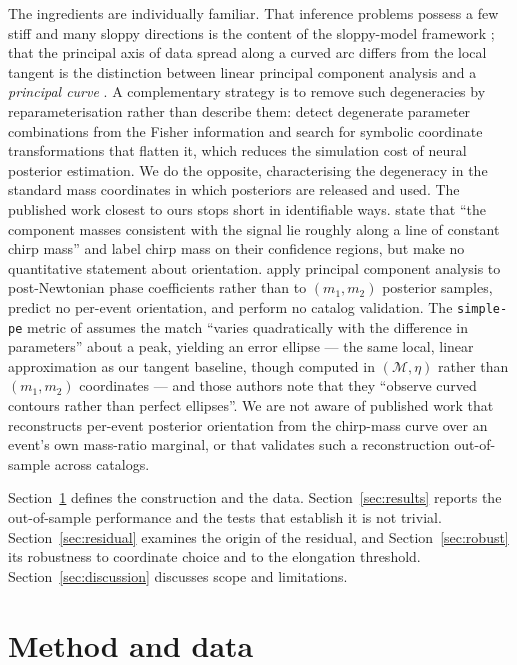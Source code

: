 \documentclass[aps,prd,twocolumn,amsmath,amssymb,nofootinbib,superscriptaddress]{revtex4-2}
\begin{document}
The ingredients are individually familiar. That inference problems possess a few stiff and many sloppy
directions is the content of the sloppy-model framework \citep{Transtrum2015}; that the principal axis of
data spread along a curved arc differs from the local tangent is the distinction between linear principal
component analysis and a \emph{principal curve} \citep{HastieStuetzle1989}. A complementary strategy is
to remove such degeneracies by reparameterisation rather than describe them: \citet{Makinen2026} detect
degenerate parameter combinations from the Fisher information and search for symbolic coordinate
transformations that flatten it, which reduces the simulation cost of neural posterior estimation. We do
the opposite, characterising the degeneracy in the standard mass coordinates in which posteriors are
released and used. The published work closest to ours stops short in identifiable ways. \citet{Hannam2013} state that ``the component masses consistent with
the signal lie roughly along a line of constant chirp mass'' and label chirp mass on their confidence
regions, but make no quantitative statement about orientation. \citet{Ohme2013} apply principal component
analysis to post-Newtonian phase coefficients rather than to $(m_1,m_2)$ posterior samples, predict no
per-event orientation, and perform no catalog validation. The \texttt{simple-pe} metric of
\citet{Fairhurst2023} assumes the match ``varies quadratically with the difference in parameters'' about a
peak, yielding an error ellipse --- the same local, linear approximation as our tangent baseline, though
computed in $(\mathcal{M},\eta)$ rather than $(m_1,m_2)$ coordinates --- and those authors note that they
``observe curved contours rather than perfect ellipses''. We are not aware of published work that
reconstructs per-event posterior orientation from the chirp-mass curve over an event's own mass-ratio
marginal, or that validates such a reconstruction out-of-sample across catalogs.

Section~\ref{sec:method} defines the construction and the data. Section~\ref{sec:results} reports the
out-of-sample performance and the tests that establish it is not trivial. Section~\ref{sec:residual}
examines the origin of the residual, and Section~\ref{sec:robust} its robustness to coordinate choice and
to the elongation threshold. Section~\ref{sec:discussion} discusses scope and limitations.

\section{Method and data}
\label{sec:method}
\end{document}
